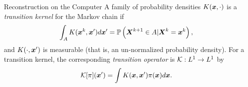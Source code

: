 \begin{chapter}{Reconstruction on the Computer}
%
A family of probability densities $K(\mbox{\boldmath$x$},\cdot)$ is a \emph{transition kernel} for the Markov chain if
\begin{equation}
  \int_A K(\mbox{\boldmath$x$}^k,\mbox{\boldmath$x$}') d\mbox{\boldmath$x$}'
    = \mathbb P\left( \mbox{\boldmath$X$}^{k+1} \in A | \mbox{\boldmath$X$}^k= \mbox{\boldmath$x$}^k\right),
\end{equation}
and $K(\cdot , \mbox{\boldmath$x$}')$ is measurable (that is, an un-normalized probability density).
For a transition kernel, the corresponding \emph{transition operator} is $\mathcal K:L^1\to L^1$ by
\begin{equation}
  \mathcal K [\pi](\mbox{\boldmath$x$}') = \int K(\mbox{\boldmath$x$},\mbox{\boldmath$x$}') \pi(\mbox{\boldmath$x$})d\mbox{\boldmath$x$}.
\end{equation}


\end{chapter}
